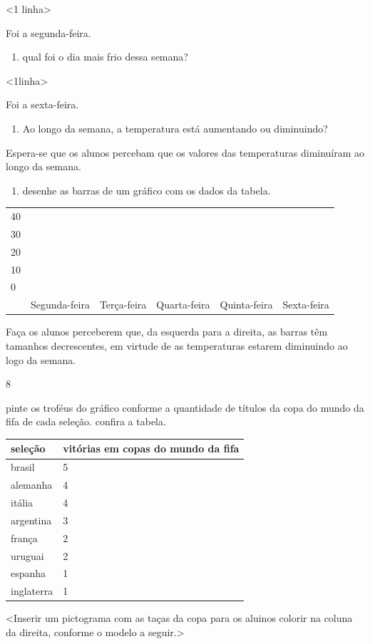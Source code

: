 \textless{}1 linha\textgreater{}

Foi a segunda-feira.

\begin{enumerate}
\def\labelenumi{\Alph{enumi})}
\item
  qual foi o dia mais frio dessa semana?
\end{enumerate}

\textless{}1linha\textgreater{}

Foi a sexta-feira.

\begin{enumerate}
\def\labelenumi{\Alph{enumi})}
\item
  Ao longo da semana, a temperatura está aumentando ou diminuindo?
\end{enumerate}

Espera-se que os alunos percebam que os valores das temperaturas diminuíram ao longo da semana.

\begin{enumerate}
\def\labelenumi{\Alph{enumi})}
\item
  desenhe as barras de um gráfico com os dados da tabela.
\end{enumerate}

\begin{longtable}[]{@{}llllll@{}}
\toprule
40 & & & & &\tabularnewline
30 & & & & &\tabularnewline
20 & & & & &\tabularnewline
10 & & & & &\tabularnewline
0 & & & & &\tabularnewline
& Segunda-feira & Terça-feira & Quarta-feira & Quinta-feira & Sexta-feira\tabularnewline
\bottomrule
\end{longtable}

Faça os alunos perceberem que, da esquerda para a direita, as barras têm
tamanhos decrescentes, em virtude de as temperaturas estarem diminuindo
ao logo da semana.

\num{8}

pinte os troféus do gráfico conforme a quantidade de títulos da copa do
mundo da fifa de cada seleção. confira a tabela.

\begin{longtable}[]{@{}ll@{}}
\toprule
seleção & vitórias em copas do mundo da fifa\tabularnewline
\midrule
\endhead
brasil & 5\tabularnewline
alemanha & 4\tabularnewline
itália & 4\tabularnewline
argentina & 3\tabularnewline
frança & 2\tabularnewline
uruguai & 2\tabularnewline
espanha & 1\tabularnewline
inglaterra & 1\tabularnewline
\bottomrule
\end{longtable}

\textless{}Inserir um pictograma com as taças da copa para os aluinos
colorir na coluna da direita, conforme o modelo a seguir.\textgreater{}

